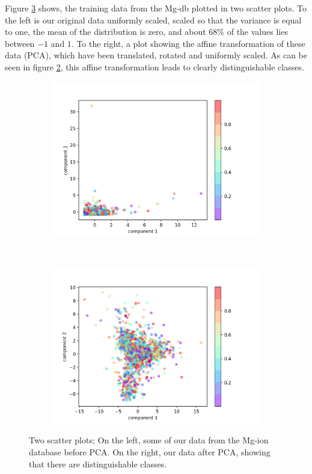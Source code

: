 	Figure \ref{fig:PCA} shows, the training data from the Mg-db plotted in two scatter plots. To the left is our original data uniformly scaled, scaled so that the variance is equal to one, the mean of the distribution is zero, and about $68\%$ of the values lies between $-1$ and $1$. To the right, a plot showing the affine transformation of these data (PCA), which have been translated, rotated and uniformly scaled. As can be seen in figure \ref{fig:PCA_b}, this affine transformation leads to clearly distinguishable classes.

\begin{figure}[h]
    \centering
    \begin{subfigure}{0.48\textwidth}
        \centering
        \includegraphics[width=\linewidth]{theory/figures/standardscalar_bpca.png}
        \caption{}
        \label{fig:PCA_a}
    \end{subfigure}%
    ~ 
        \begin{subfigure}{0.48\textwidth}
        \centering
        \includegraphics[width=\linewidth]{theory/figures/standardscalar_apca.png}
        \caption{}
        \label{fig:PCA_b}
    \end{subfigure}
	\caption{Two scatter plots; On the left, some of our data from the Mg-ion database before PCA. On the right, our data after PCA, showing that there are distinguishable classes.}
	\label{fig:PCA}
\end{figure}
